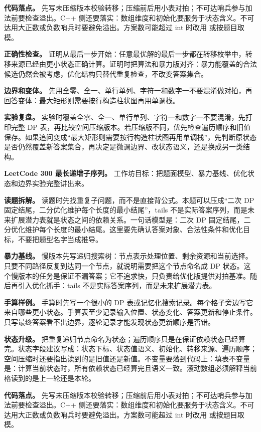 \textbf{代码落点。} 先写未压缩版本校验转移；压缩前后用小表对拍；不可达哨兵参与加法前要检查溢出。C++ 侧还要落实：数组维度和初始化要服务于状态含义。不可达用大正数或负数哨兵时要避免溢出。方案数可能超过 int 时改用  或按题目取模。

\textbf{正确性检查。} 证明从最后一步开始：任意最优解的最后一步都在转移枚举中，转移来源已经由更小状态正确计算。证明时把算法和暴力版对齐：暴力能覆盖的合法候选仍然会被考虑，优化结构只替代重复检查，不改变答案集合。

\textbf{边界和变体。} 先用全零、全一、单行单列、字符一和数字一不要混淆做对拍，再回答变体：最大矩形则需要按行构造柱状图再用单调栈。

\textbf{实验复盘。} 实验时覆盖全零、全一、单行单列、字符一和数字一不要混淆，先打印完整 DP 表，再比较空间压缩版本。若压缩版不同，优先检查遍历顺序和旧值保存。如果追问变成“最大矩形则需要按行构造柱状图再用单调栈”，先判断原状态是否仍然覆盖新答案集合，再决定是微调边界、改状态语义，还是换成另一类结构。

\noindent\textbf{LeetCode 300 最长递增子序列。} 工作坊目标：把题面模型、暴力基线、优化状态和边界实验完整讲出来。

\textbf{读题拆解。} 读题时先找重复子问题，而不是直接背公式。本题可以压成“二次 DP 固定结尾，二分优化维护每个长度的最小结尾”，tails 不是实际答案序列，而是未来扩展潜力表就是状态之间的依赖关系。一句话模型是：二次 DP 固定结尾，二分优化维护每个长度的最小结尾。这里要先确认答案对象、合法性条件和优化目标，不要把题型名字当成推导。

\textbf{暴力基线。} 慢版本先写递归搜索树：节点表示处理位置、剩余资源和当前选择。只要不同路径反复到达同一个节点，就说明需要把这个节点命名成 DP 状态。这个慢版本的任务是保证不漏答案；它不追求快，只负责给优化版提供对拍基准。随后再引入优化抓手：tails 不是实际答案序列，而是未来扩展潜力表。

\textbf{手算样例。} 手算时先写一个很小的 DP 表或记忆化搜索记录。每个格子旁边写它来自哪些更小状态。手算表至少记录输入位置、状态变化、答案更新和停止条件。只写最终答案看不出边界，逐轮记录才能发现状态更新顺序是否错。

\textbf{状态升级。} 把重复递归节点命名为状态；遍历顺序只是在保证依赖状态已经算完。状态字段建议写成：状态下标、状态值语义、初始化、转移来源、遍历顺序；空间压缩时还要指出读到的是旧值还是新值。不变量要落到代码上：填表不变量是：计算当前状态时，所有依赖状态已经算完且语义一致。滚动数组必须解释当前格读到的是上一轮还是本轮。

\textbf{代码落点。} 先写未压缩版本校验转移；压缩前后用小表对拍；不可达哨兵参与加法前要检查溢出。C++ 侧还要落实：数组维度和初始化要服务于状态含义。不可达用大正数或负数哨兵时要避免溢出。方案数可能超过 int 时改用  或按题目取模。

